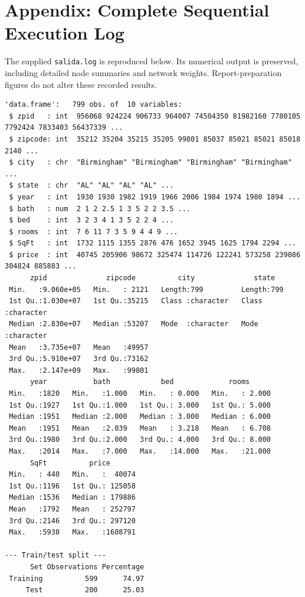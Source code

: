 \documentclass[11pt,a4paper]{article}
\begin{document}
\section*{Appendix: Complete Sequential Execution Log}
The supplied \texttt{salida.log} is reproduced below. Its numerical output is preserved, including detailed node summaries and network weights. Report-preparation figures do not alter these recorded results.
\begin{lstlisting}[style=console]
'data.frame':	799 obs. of  10 variables:
 $ zpid   : int  956068 924224 906733 964007 74504350 81982160 7780105 7792424 7833403 56437339 ...
 $ zipcode: int  35212 35204 35215 35205 99801 85037 85021 85021 85018 2140 ...
 $ city   : chr  "Birmingham" "Birmingham" "Birmingham" "Birmingham" ...
 $ state  : chr  "AL" "AL" "AL" "AL" ...
 $ year   : int  1930 1930 1982 1919 1966 2006 1984 1974 1980 1894 ...
 $ bath   : num  2 1 2 2.5 1 3 5 2 2 3.5 ...
 $ bed    : int  3 2 3 4 1 3 5 2 2 4 ...
 $ rooms  : int  7 6 11 7 3 5 9 4 4 9 ...
 $ SqFt   : int  1732 1115 1355 2876 476 1652 3945 1625 1794 2294 ...
 $ price  : int  40745 205906 98672 325474 114726 122241 573258 239086 304824 885883 ...
      zpid              zipcode          city              state          
 Min.   :9.060e+05   Min.   : 2121   Length:799         Length:799        
 1st Qu.:1.030e+07   1st Qu.:35215   Class :character   Class :character  
 Median :2.830e+07   Median :53207   Mode  :character   Mode  :character  
 Mean   :3.735e+07   Mean   :49957                                        
 3rd Qu.:5.910e+07   3rd Qu.:73162                                        
 Max.   :2.147e+09   Max.   :99801                                        
      year           bath            bed             rooms       
 Min.   :1820   Min.   :1.000   Min.   : 0.000   Min.   : 2.000  
 1st Qu.:1927   1st Qu.:1.000   1st Qu.: 3.000   1st Qu.: 5.000  
 Median :1951   Median :2.000   Median : 3.000   Median : 6.000  
 Mean   :1951   Mean   :2.039   Mean   : 3.218   Mean   : 6.708  
 3rd Qu.:1980   3rd Qu.:2.000   3rd Qu.: 4.000   3rd Qu.: 8.000  
 Max.   :2014   Max.   :7.000   Max.   :14.000   Max.   :21.000  
      SqFt          price        
 Min.   : 440   Min.   :  40074  
 1st Qu.:1196   1st Qu.: 125058  
 Median :1536   Median : 179886  
 Mean   :1792   Mean   : 252797  
 3rd Qu.:2146   3rd Qu.: 297120  
 Max.   :5938   Max.   :1608791  

--- Train/test split ---
      Set Observations Percentage
 Training          599      74.97
     Test          200      25.03


\end{lstlisting}
\end{document}
